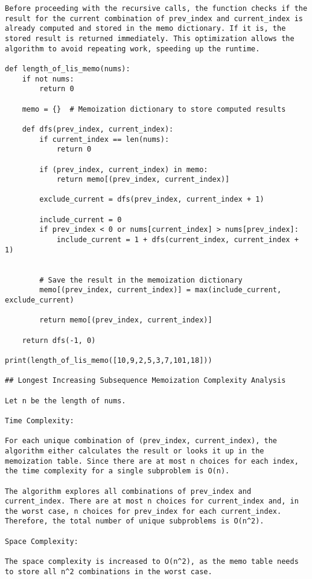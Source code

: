 \begin{verbatim}
Before proceeding with the recursive calls, the function checks if the result for the current combination of prev_index and current_index is already computed and stored in the memo dictionary. If it is, the stored result is returned immediately. This optimization allows the algorithm to avoid repeating work, speeding up the runtime.

def length_of_lis_memo(nums):
    if not nums:
        return 0

    memo = {}  # Memoization dictionary to store computed results

    def dfs(prev_index, current_index):
        if current_index == len(nums):
            return 0

        if (prev_index, current_index) in memo:
            return memo[(prev_index, current_index)]
        
        exclude_current = dfs(prev_index, current_index + 1)

        include_current = 0
        if prev_index < 0 or nums[current_index] > nums[prev_index]:
            include_current = 1 + dfs(current_index, current_index + 1)

        
        # Save the result in the memoization dictionary
        memo[(prev_index, current_index)] = max(include_current, exclude_current)

        return memo[(prev_index, current_index)]

    return dfs(-1, 0)

print(length_of_lis_memo([10,9,2,5,3,7,101,18]))

## Longest Increasing Subsequence Memoization Complexity Analysis

Let n be the length of nums.

Time Complexity:

For each unique combination of (prev_index, current_index), the algorithm either calculates the result or looks it up in the memoization table. Since there are at most n choices for each index, the time complexity for a single subproblem is O(n).

The algorithm explores all combinations of prev_index and current_index. There are at most n choices for current_index and, in the worst case, n choices for prev_index for each current_index. Therefore, the total number of unique subproblems is O(n^2).

Space Complexity: 

The space complexity is increased to O(n^2), as the memo table needs to store all n^2 combinations in the worst case.


\end{verbatim}
